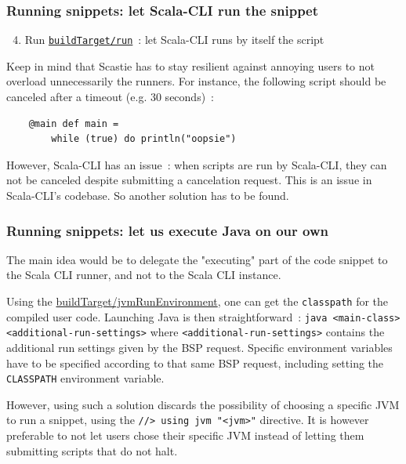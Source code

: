 \documentclass{article}
\begin{document}
\subsubsection{Running snippets: let Scala-CLI run the snippet}

\begin{enumerate}
    \setcounter{enumi}{3}
    \item Run \href{https://build-server-protocol.github.io/docs/specification#compile-request}{\lstinline{buildTarget/run}}~: let Scala-CLI runs by itself the script
\end{enumerate}

Keep in mind that Scastie has to stay resilient against annoying users to not overload unnecessarily the runners. For instance, the following script should be canceled after a timeout (e.g. 30 seconds)~:

\begin{lstlisting}
    @main def main =
        while (true) do println("oopsie")
\end{lstlisting}

However, Scala-CLI has an issue~: when scripts are run by Scala-CLI, they can not be canceled despite submitting a cancelation request. This is an issue in Scala-CLI's codebase. So another solution has to be found.

\subsubsection{Running snippets: let us execute Java on our own}

The main idea would be to delegate the "executing" part of the code snippet to the Scala CLI runner, and not to the Scala CLI instance.

Using the \href{https://build-server-protocol.github.io/docs/extensions/jvm#run-environment-request}{buildTarget/jvmRunEnvironment}, one can get the \lstinline{classpath} for the compiled user code. Launching Java is then straightforward~: \lstinline{java <main-class> <additional-run-settings>} where \lstinline{<additional-run-settings>} contains the additional run settings given by the BSP request. Specific environment variables have to be specified according to that same BSP request, including setting the \lstinline{CLASSPATH} environment variable.

However, using such a solution discards the possibility of choosing a specific JVM to run a snippet, using the \lstinline{//> using jvm "<jvm>"} directive. It is however preferable to not let users chose their specific JVM instead of letting them submitting scripts that do not halt.
\end{document}
